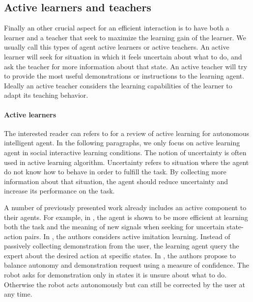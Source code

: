 \subsection{Active learners and teachers}

Finally an other crucial aspect for an efficient interaction is to have both a learner and a teacher that seek to maximize the learning gain of the learner. We usually call this types of agent active learners or active teachers. An active learner will seek for situation in which it feels uncertain about what to do, and ask the teacher for more information about that state. An active teacher will try to provide the most useful demonstrations or instructions to the learning agent. Ideally an active teacher considers the learning capabilities of the learner to adapt its teaching behavior. 

\paragraph{Active learners} 

The interested reader can refers to \cite{lopes2014active} for a review of active learning for autonomous intelligent agent. In the following paragraphs, we only focus on active learning agent in social interactive learning conditions. The notion of uncertainty is often used in active learning algorithm. Uncertainty refers to situation where the agent do not know how to behave in order to fulfill the task. By collecting more information about that situation, the agent should reduce uncertainty and increase its performance on the task.

A number of previously presented work already includes an active component to their agents. For example, in \cite{macl11simul}, the agent is shown to be more efficient at learning both the task and the meaning of new signals when seeking for uncertain state-action pairs. In \cite{judah2012active}, the authors considers active imitation learning. Instead of passively collecting demonstration from the user, the learning agent query the expert about the desired action at specific states. In \cite{chernova09jair}, the authors propose to balance autonomy and demonstration request using a measure of confidence. The robot asks for demonstration only in states it is unsure about what to do. Otherwise the robot acts autonomously but can still be corrected by the user at any time.


